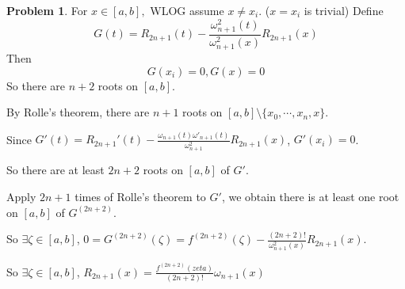 \documentclass[a4paper]{article}
\theoremstyle{definition}
\newtheorem{problem}{Problem}
\theoremstyle{plain}
\newcommand{\dps}{\displaystyle}
\numberwithin{equation}{problem}
\begin{document}
\begin{problem}
    For  $ x\in [a,b], $ WLOG assume  $ x\neq x_i $. ($ x=x_i $ is trivial)
    Define 
    \[G(t)=R_{2n+1}(t)-\frac{\omega_{n+1}^2(t)}{\omega^2_{n+1}(x)}R_{2n+1}(x)\]
    Then 
    \[G(x_i)=0,G(x)=0\]
    So there are   $ n+2 $ roots on  $ [a,b] $.
    
    By Rolle's theorem, there are  $ n+1 $ roots on  $ [a,b]\setminus\{x_0,\cdots,x_n,x\} $.
    
    Since  $ G'(t)=R_{2n+1}'(t)-\frac{\omega_{n+1}(t)\omega'_{n+1}(t)}{\omega^2_{n+1}}R_{2n+1}(x) $,  $ G'(x_i)=0 $.
    
    So there are at least $ 2n+2 $ roots on $ [a,b] $ of  $ G' $.
    
    Apply  $ 2n+1 $ times of Rolle's theorem to  $ G' $, we obtain there is at least one root on  $ [a,b] $  of  $ G^{(2n+2)} $.

    So  $ \exists \zeta\in [a,b] $,  $ 0=G^{(2n+2)}(\zeta)=f^{(2n+2)}(\zeta)-\frac{(2n+2)!}{\omega_{n+1}^2(x)}R_{2n+1}(x) $.
    
    So  $ \exists \zeta\in [a,b] $,   $ R_{2n+1}(x)=\dps\frac{f^{(2n+2)}(zeta)}{(2n+2)!}\omega_{n+1}(x) $ 
\end{problem}
\end{document}
